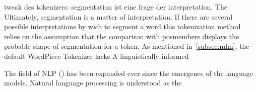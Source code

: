 tweak des tokenizers: segmentation ist eine frage der interpretation.
The
Ultimately, segmentation is a matter of interpretation.
If there are several possible interpretations by wich to segment a word this tokenization method relies on the assumption that the comparison with \ac{pos}\hypen members displays the probable shape of segmentation for a token.
As mentioned in~\ref{subsec:mlm}, the default WordPiece Tokenizer lacks
A linguistically informed



The field of NLP  (\cite{METZLER2016}) has been expanded ever since the emergence of the language models.
Natural language processing is understood as the
